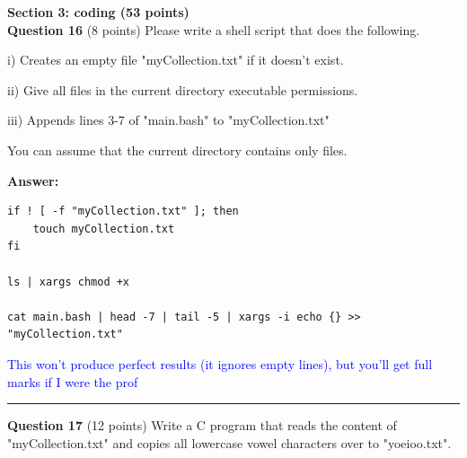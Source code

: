 \documentclass{exam}
\begin{document}
{\Large\textbf{Section 3: coding (53 points)}}
\\

\textbf{Question 16} (8 points) Please write a shell script that does the following.

i) Creates an empty file "myCollection.txt" if it doesn't exist.

ii) Give all files in the current directory executable permissions.

iii) Appends lines 3-7 of "main.bash" to "myCollection.txt"

You can assume that the current directory contains only files. 

\textbf{Answer:}

\begin{lstlisting}
if ! [ -f "myCollection.txt" ]; then
    touch myCollection.txt
fi

ls | xargs chmod +x 

cat main.bash | head -7 | tail -5 | xargs -i echo {} >> "myCollection.txt" 
\end{lstlisting}

\textcolor{blue}{This won't produce perfect results (it ignores empty lines), but you'll get full marks if I were the prof}

\newpage




\begin{center}\noindent\rule{6in}{0.4pt}\end{center}

\textbf{Question 17} (12 points) Write a C program that reads the content of "myCollection.txt" and copies all lowercase vowel characters over to "yoeioo.txt".
\end{document}
